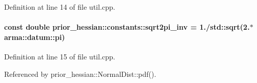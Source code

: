 Definition at line 14 of file util.\+cpp.

\paragraph[{\texorpdfstring{sqrt2pi\+\_\+inv}{sqrt2pi_inv}}]{\setlength{\rightskip}{0pt plus 5cm}const double prior\+\_\+hessian\+::constants\+::sqrt2pi\+\_\+inv = 1./std\+::sqrt(2.$\ast$arma\+::datum\+::pi)}\hypertarget{namespaceprior__hessian_1_1constants_a7a6ae61175a9b764667984ec36da24bd}{}\label{namespaceprior__hessian_1_1constants_a7a6ae61175a9b764667984ec36da24bd}


Definition at line 15 of file util.\+cpp.



Referenced by prior\+\_\+hessian\+::\+Normal\+Dist\+::pdf().


